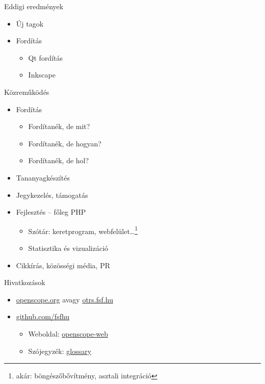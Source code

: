 \documentclass{beamer}
\begin{document}
  \begin{frame}{Eddigi eredmények}
    \begin{itemize}
      \item Új tagok
      \item Fordítás
        \begin{itemize}
          \item Qt fordítás
          \item Inkscape
        \end{itemize}
    \end{itemize}
  \end{frame}

  \begin{frame}{Közreműködés}
    \begin{itemize}
      \item Fordítás
      \begin{itemize}
        \item Fordítanék, de mit?
        \item Fordítanék, de hogyan?
        \item Fordítanék, de hol?
      \end{itemize}
      \item Tananyagkészítés
      \item Jegykezelés, támogatás
      \item Fejlesztés – főleg PHP
      \begin{itemize}
        \item Szótár: keretprogram, webfelület…\footnote{akár: böngészőbővítmény, asztali integráció}
        \item Statisztika és vizualizáció
      \end{itemize}
      \item{Cikkírás, közösségi média, PR}
    \end{itemize}
  \end{frame}

  \begin{frame}{Hivatkozások}
    \begin{itemize}
      \item \href{http://openscope.org}{openscope.org} avagy \href{http://otrs.fsf.hu}{otrs.fsf.hu}
      \item \href{https://github.com/fsfhu}{github.com/fsfhu}
      \begin{itemize}
        \item Weboldal: \href{https://github.com/fsfhu/openscope-web}{openscope-web}
        \item Szójegyzék: \href{https://github.com/fsfhu/glossary}{glossary}
      \end{itemize}
    \end{itemize}
  \end{frame}
\end{document}
